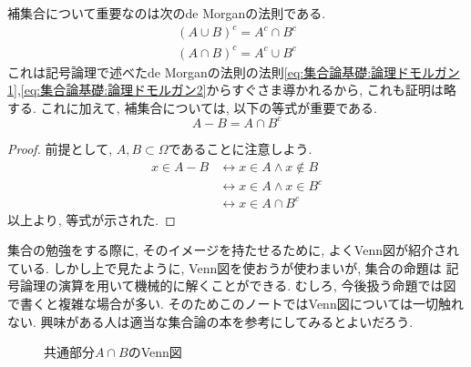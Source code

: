         補集合について重要なのは次のde Morganの法則である.
        \begin{align}
            (A\cup B)^c = A^c \cap B^c \label{eq:集合論基礎:集合ドモルガン1}\\
            (A\cap B)^c = A^c \cup B^c \label{eq:集合論基礎:集合ドモルガン2}
        \end{align}
        これは記号論理で述べたde Morganの法則の法則\eqref{eq:集合論基礎:論理ドモルガン1},\eqref{eq:集合論基礎:論理ドモルガン2}からすぐさま導かれるから, これも証明は略する.
        これに加えて, 補集合については, 以下の等式が重要である.
        \begin{equation}
            A-B = A\cap B^c \label{eq:集合論基礎:差集合を補集合で表す}
        \end{equation}
        \begin{proof}
            前提として, $A,B\subset \varOmega$であることに注意しよう.
            \begin{align*}
                x\in A-B 
                &\leftrightarrow x\in A \land x\not\in B\\
                &\leftrightarrow x\in A \land x\in B^c\\
                &\leftrightarrow x\in A\cap B^c
            \end{align*}
            以上より, 等式が示された.
        \end{proof}
        集合の勉強をする際に, そのイメージを持たせるために, よくVenn図が紹介されている. しかし上で見たように, Venn図を使おうが使わまいが, 集合の命題は
        記号論理の演算を用いて機械的に解くことができる. むしろ, 今後扱う命題では図で書くと複雑な場合が多い.
        そのためこのノートではVenn図については一切触れない. 興味がある人は適当な集合論の本を参考にしてみるとよいだろう.
        \begin{figure}[h]
            \centering
            \caption{共通部分$A\cap B$のVenn図}
        \end{figure}
    \clearpage
